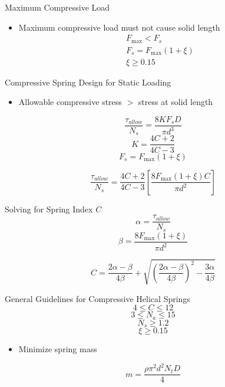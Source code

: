 \documentclass[10pt, svgnames]{beamer}
\begin{document}
\begin{frame}[label={sec:orgc574b46}]{Maximum Compressive Load}
\begin{itemize}
\item Maximum compressive load must not cause solid length
\begin{gather*}
  F_{\max}  < F_s \\
  F_s = F_{\max}(1 + \xi) \\
  \xi \geqslant 0.15
\end{gather*}
\end{itemize}
\end{frame}

\begin{frame}[label={sec:org6f462c2}]{Compressive Spring Design for Static Loading}
\begin{itemize}
\item Allowable compressive stress \(>\) stress at solid length
\end{itemize}

$$ \frac{\tau_{allow}}{N_s} = \frac{8KF_sD}{\pi d^3} $$
$$ K = \frac{4C+2}{4C-3} $$ 
$$ F_s = F_{\max}(1+\xi) $$

$$ \frac{\tau_{allow}}{N_s} = \frac{4C+2}{4C-3} \left[ \frac{8F_{\max}(1+\xi)C}{\pi d^2} \right] $$
\end{frame}

\begin{frame}[label={sec:orgaac5058}]{Solving for Spring Index \(C\)}
$$ \alpha = \frac{\tau_{allow}}{N_s} $$
$$ \beta = \frac{8F_{\max}(1+\xi)}{\pi d^2} $$

$$ C = \frac{2\alpha - \beta}{4\beta} + \sqrt{ \left( \frac{2\alpha - \beta}{4\beta} \right)^2 - \frac{3\alpha}{4\beta} } $$
\end{frame}

\begin{frame}[label={sec:org801a2ba}]{General Guidelines for Compressive Helical Springs}
$$ 4 \leqslant C \leqslant 12 $$
$$ 3 \leqslant N_a \leqslant 15 $$
$$ N_s \geqslant 1.2 $$
$$ \xi \geqslant 0.15 $$

\begin{itemize}
\item Minimize spring mass
\end{itemize}

$$ m = \frac{\rho \pi^2 d^2 N_t D}{4} $$
\end{frame}
\end{document}
